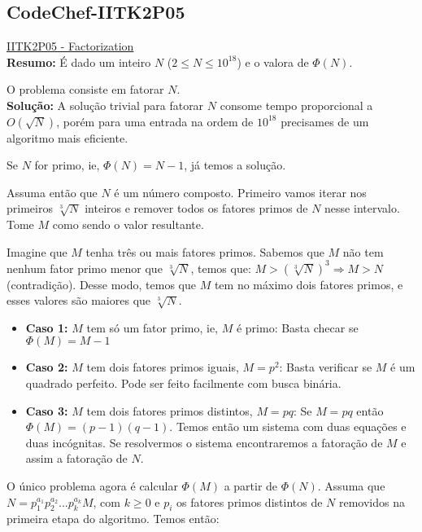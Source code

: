 \subsection{CodeChef-IITK2P05}
\href{https://www.codechef.com/problems/IITK2P05}{IITK2P05 - Factorization}\\

\textbf{Resumo:}
É dado um inteiro $N$ ($2 \leq N \leq 10^{18}$) e o valora de $\Phi(N)$.

O problema consiste em fatorar $N$. 
\\

\textbf{Solução:}
A solução trivial para fatorar $N$ consome tempo proporcional a $O(\sqrt{N})$, porém para uma entrada na ordem de $10^{18}$ precisames de um algoritmo mais eficiente.

Se $N$ for primo, ie, $\Phi(N) = N-1$, já temos a solução.

Assuma então que $N$ é um número composto. Primeiro vamos iterar nos primeiros $\sqrt[3]{N}$ inteiros e remover todos os fatores primos de $N$ nesse intervalo. Tome $M$ como sendo o valor resultante.

Imagine que $M$ tenha três ou mais fatores primos. Sabemos que $M$ não tem nenhum fator primo menor que $\sqrt[3]{N}$, temos que: $M > (\sqrt[3]{N})^3 \Rightarrow M > N$ (contradição).
Desse modo, temos que $M$ tem no máximo dois fatores primos, e esses valores são maiores que $\sqrt[3]{N}$.

\begin{itemize}
  \item \textbf{Caso 1:} $M$ tem só um fator primo, ie, $M$ é primo:
		Basta checar se $\Phi(M) = M-1$

  \item \textbf{Caso 2:} $M$ tem dois fatores primos iguais, $M = p ^2$:
		Basta verificar se $M$ é um quadrado perfeito. Pode ser feito facilmente com busca binária.

  \item \textbf{Caso 3:} $M$ tem dois fatores primos distintos, $M = pq$:
		Se $M=pq$ então $\Phi(M) = (p-1)(q-1)$. Temos então um sistema com duas equações e duas incógnitas. Se resolvermos o sistema encontraremos a fatoração de $M$ e assim a fatoração de $N$.
\end{itemize}
O único problema agora é calcular $\Phi(M)$ a partir de $\Phi(N)$. Assuma que $N = p_1^{a_1}p_2^{a_2}...p_k^{a_k}M$, com $k \geq 0$ e 
 $p_i$ os fatores primos distintos de $N$ removidos na primeira etapa do algoritmo. Temos então:

